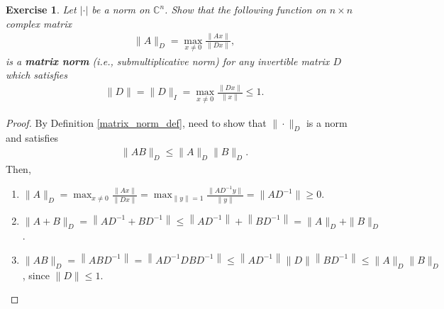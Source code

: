 \documentclass[11pt]{book}
\newtheorem{exercise}{Exercise}[section]
\theoremstyle{definition}
\numberwithin{equation}{chapter}
\begin{document}
\begin{exercise}
Let $|\cdot|$ be a norm on $\mathbb{C}^n$. Show that the following function on $n \times n$ complex matrix
\begin{align*}
    \|A\|_D = \max_{x \neq 0} \frac{\|Ax\|}{\|Dx\|},
\end{align*}
is a {\bf matrix norm} (i.e., submultiplicative norm) for any invertible matrix $D$ which satisfies 
\begin{align*}
    \|D\| = \|D\|_I = \max_{x\neq 0} \frac{\|Dx\|}{\|x\|} \leq 1.
\end{align*}
\end{exercise}
\begin{proof}
By Definition \ref{matrix_norm_def}, need to show that $\|\cdot \|_D$ is a norm and satisfies
\begin{align*}
    \|AB\|_D \leq \|A\|_D \|B\|_D.
\end{align*}
Then,
\begin{enumerate}[label=(\alph*)]
    \item $\|A\|_D = \max_{x \neq 0} \frac{\|Ax\|}{\|Dx\|} = \max_{\|y\|=1} \frac{\|AD^{-1}y\|}{\|y\|} = \|AD^{-1}\| \geq 0$.
    
    \item $\|A + B\|_D = \left\|AD^{-1} + BD^{-1}\right\| \leq \left\|AD^{-1}\right\| + \left\|BD^{-1}\right\| = \|A\|_D + \|B\|_D$.
    
    \item $\|AB\|_D = \left\|ABD^{-1}\right\| = \left\|AD^{-1}DBD^{-1}\right\| \leq \left\|AD^{-1}\right\| \|D\| \left\|BD^{-1}\right\| \leq \|A\|_D \|B\|_D$, since $\|D\| \leq 1$.
\end{enumerate}
\end{proof}

\medskip
\end{document}
